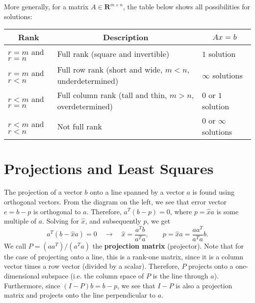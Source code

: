 \documentclass[11pt]{article}
\theoremstyle{plain}
\theoremstyle{definition}
\theoremstyle{remark}
\numberwithin{equation}{section}
\begin{document}
More generally, for a matrix $A \in \mathbf{R}^{m \times n}$, the table below shows all possibilities for solutions:
\begin{center}
\begin{tabular}{l | l | l} 
\multicolumn{1}{c|}{Rank} & \multicolumn{1}{c|}{Description} & \multicolumn{1}{c}{$Ax = b$}  \\
\hline
\hline
$r = m$ and $r = n$ & Full rank (square and invertible) & $1$ solution \\
$r = m$ and $r < n$ & Full row rank (short and wide, $m < n$, underdetermined) & $\infty$ solutions \\
$r < m$ and $r = n$ & Full column rank (tall and thin, $m > n$, overdetermined) & $0$ or $1$ solution \\
$r < m$ and $r < n$ & Not full rank & $0$ or $\infty$ solutions \\
\end{tabular}
\end{center}













\section {Projections and Least Squares}

The projection of a vector $b$ onto a line spanned by a vector $a$ is found using orthogonal vectors. From the diagram on the left, we see that error vector $e = b - p$ is orthogonal to $a$. Therefore, $a^T (b - p) = 0$, where $p = \hat{x} a$ is some multiple of $a$. Solving for $\hat{x}$, and subsequently $p$, we get
\begin{equation*}
a^T (b - \hat{x} a) = 0 \quad \rightarrow \quad \hat{x} = \frac{a^T b}{a^T a}, \qquad p = \hat{x} a = \frac{a a^T}{a^T a} b.
\end{equation*}
We call $P = (a a^T)/(a^T a)$ the {\bf projection matrix} (projector). Note that for the case of projecting onto a line, this is a rank-one matrix, since it is a column vector times a row vector (divided by a scalar). Therefore, $P$ projects onto a one-dimensional subspace (i.e. the column space of $P$ is the line through $a$). Furthermore, since $(I - P)b = b - p$, we see that $I - P$ is also a projection matrix and projects onto the line perpendicular to $a$.
\end{document}
